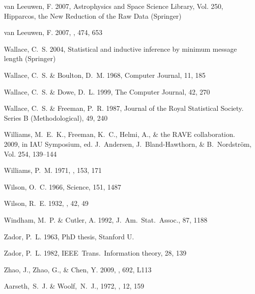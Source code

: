 \begin{thebibliography}{99}
{van Leeuwen}, F. 2007{}, Astrophysics and Space Science Library,
  Vol. 250, {Hipparcos, the New Reduction of the Raw Data} ({Springer})

{van Leeuwen}, F. 2007{}, \aap, 474, 653

{Wallace}, C.~S. 2004, {Statistical and inductive inference by minimum message
  length} ({Springer})

{Wallace}, C.~S. \& {Boulton}, D.~M. 1968, {Computer Journal}, 11, 185

{Wallace}, C.~S. \& {Dowe}, D.~L. 1999, {The Computer Journal}, 42, 270

{Wallace}, C.~S. \& {Freeman}, P.~R. 1987, Journal of the Royal Statistical
  Society. Series B (Methodological), 49, 240

{Williams}, M.~E.~K., {Freeman}, K.~C., {Helmi}, A., \& {the RAVE
  collaboration}. 2009, in IAU Symposium, ed. J.~{Andersen},
  J.~{Bland-Hawthorn}, \& B.~{Nordstr{\"o}m}, Vol. 254, 139--144

{Williams}, P.~M. 1971, \mnras, 153, 171

{Wilson}, O.~C. 1966, Science, 151, 1487

{Wilson}, R.~E. 1932, \aj, 42, 49

{Windham}, M.~P. \& {Cutler}, A. 1992, {J.~Am.~Stat.~Assoc.}, 87, 1188

{Zador}, P.~L. 1963, PhD thesis, Stanford U.

{Zador}, P.~L. 1982, {IEEE~Trans.~Information theory}, 28, 139

{Zhao}, J., {Zhao}, G., \& {Chen}, Y. 2009, \apjl, 692, L113



  Aarseth,~S.~J. \& Woolf,~N.~J., 1972,
  \aplett, 12, 159


\end{thebibliography}
